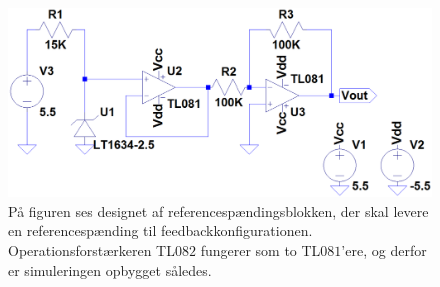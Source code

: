 \begin{figure}[H]
	\centering
	\includegraphics[scale=0.4]{figures/cProblemloesning/Reference_komparator.PNG}
	\caption{På figuren ses designet af referencespændingsblokken, der skal levere en referencespænding til feedbackkonfigurationen. Operationsforstærkeren TL$082$ fungerer som to TL$081$'ere, og derfor er simuleringen opbygget således. \cite{Corporation2013}}
	\label{fig:ref_komparator}
\end{figure}

